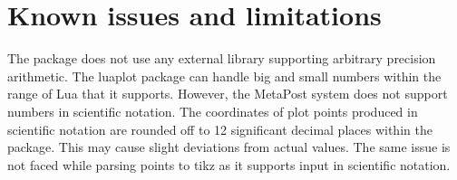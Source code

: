 \documentclass{article}
\begin{document}
\section{Known issues and limitations} 
The package does not use any external library supporting arbitrary precision arithmetic. The luaplot package can handle big and small numbers within the range of Lua that it supports. However, the MetaPost system does not support numbers in scientific notation. The coordinates of plot points produced in scientific notation are rounded off to 12 significant decimal places within the package. This may cause slight deviations from actual values. The same issue is not faced while parsing points to tikz as it supports input in scientific notation.  
\printbibliography
\end{document}
